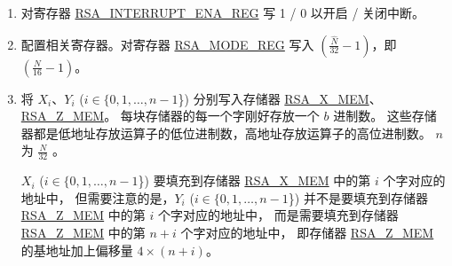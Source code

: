 \documentclass[main\_\_CN.tex]{subfiles}
\begin{document}
\begin{enumerate}

    \item 对寄存器 \hyperref[regdesc:RSAINTERRUPTENAREG]{RSA\_INTERRUPT\_ENA\_REG} 写 1 / 0 以开启 / 关闭中断。
    
    \item 配置相关寄存器。对寄存器 \hyperref[regdesc:RSAMODEXPMODEREG]{RSA\_MODE\_REG} 写入 \begin{math}( \frac{\hat{N}}{32} - 1 )\end{math}，即 \begin{math}(  \frac{N}{16} - 1 )\end{math}。

    \item 将 \begin{math}{X}_{i}\end{math}、\begin{math}{Y}_{i}\end{math} (\begin{math}i \in \{ 0, 1, \dots, n-1 \end{math}\}) 分别写入存储器 \hyperref[regdesc:RSAmemory]{RSA\_X\_MEM}、\hyperref[regdesc:RSAmemory]{RSA\_Z\_MEM}。
        每块存储器的每一个字刚好存放一个 \begin{math}b\end{math} 进制数。
        这些存储器都是低地址存放运算子的低位进制数，高地址存放运算子的高位进制数。
        \begin{math}n\end{math} 为 \begin{math} \frac{N}{32} \end{math} 。
        
         \begin{math}{X}_{i}\end{math} (\begin{math}i \in \{ 0, 1, \dots, n-1 \end{math}\}) 要填充到存储器 \hyperref[regdesc:RSAmemory]{RSA\_X\_MEM} 中的第 \begin{math}i\end{math} 个字对应的地址中，
        但需要注意的是，\begin{math}{Y}_{i}\end{math} (\begin{math}i\in\{ 0, 1, \dots, n-1 \end{math}\}) 并不是要填充到存储器 \hyperref[regdesc:RSAmemory]{RSA\_Z\_MEM} 中的第 \begin{math}i\end{math} 个字对应的地址中，
        而是需要填充到存储器 \hyperref[regdesc:RSAmemory]{RSA\_Z\_MEM} 中的第 \begin{math}n+i\end{math} 个字对应的地址中，
        即存储器 \hyperref[regdesc:RSAmemory]{RSA\_Z\_MEM} 的基地址加上偏移量 \begin{math}4 \times (n+i) \end{math}。
        

\end{enumerate}
\end{document}
